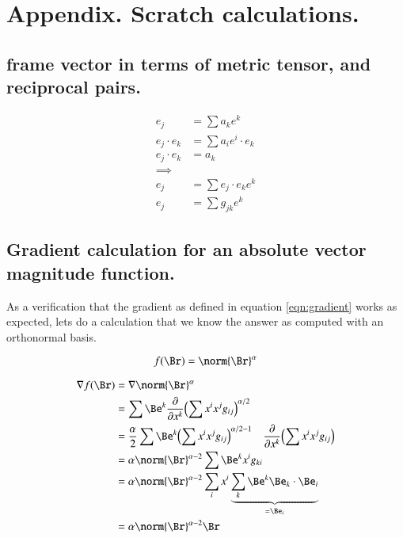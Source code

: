 \documentclass{article}
\newcommand{\grad}[0]{\nabla}
\newcommand{\PD}[2]{ \frac{\partial{#1}}{\partial {#2}} }
\begin{document}
\section{ Appendix.  Scratch calculations. }

\subsection{ frame vector in terms of metric tensor, and reciprocal pairs. }

\begin{align*}
e_j &= \sum a_k e^k \\
e_j \cdot e_k &= \sum a_i e^i \cdot e_k \\
e_j \cdot e_k &= a_k \\
\implies & \\
e_j &= \sum e_j \cdot e_k e^k \\
e_j &= \sum g_{jk} e^k
\end{align*}

\subsection{ Gradient calculation for an absolute vector magnitude function. }

As a verification that the gradient as defined in equation \ref{eqn:gradient} works as expected, lets do a calculation that we know the answer as computed with an
orthonormal basis.

\begin{equation*}
f(\Br) = \norm{\Br}^\alpha
\end{equation*}

\begin{align*}
\grad f(\Br) 
&= \grad \norm{\Br}^\alpha \\
&= \sum \Be^k \PD{} {x^k} {{\left(\sum x^i x^j g_{ij}\right)}^{\alpha/2}} \\
&= \frac{\alpha}{2} \sum \Be^k {{\left(\sum x^i x^j g_{ij}\right)}^{\alpha/2 -1}} \quad \PD{}{x^k} {\left(\sum x^i x^j g_{ij}\right)} \\
&= \alpha \norm{\Br}^{\alpha-2} \sum \Be^k x^i g_{ki} \\
&= \alpha \norm{\Br}^{\alpha-2} \sum_i x^i \underbrace{\sum_k \Be^k \Be_k \cdot \Be_i}_{=\Be_i} \\
&= \alpha \norm{\Br}^{\alpha-2} \Br
\end{align*}
\end{document}
